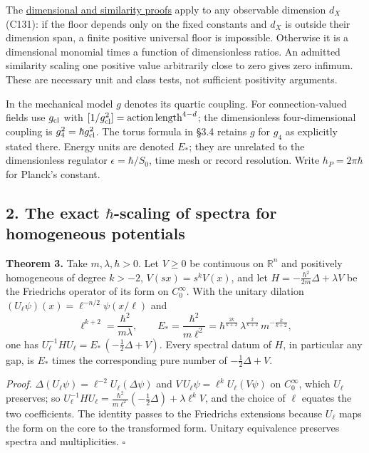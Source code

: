 \documentclass[11pt,a4paper]{article}
\begin{document}
The \href{action-unit-dimensional-selection.md}{dimensional and
similarity proofs} apply to any observable dimension \(d_X\) (C131): if
the floor depends only on the fixed constants and \(d_X\) is outside
their dimension span, a finite positive universal floor is impossible.
Otherwise it is a dimensional monomial times a function of dimensionless
ratios. An admitted similarity scaling one positive value arbitrarily
close to zero gives zero infimum. These are necessary unit and class
tests, not sufficient positivity arguments.

In the mechanical model \(g\) denotes its quartic coupling. For
connection-valued fields use \(g_{\rm cl}\) with
\([1/g_{\rm cl}^2]=\mathrm{action}\,\mathrm{length}^{4-d}\); the
dimensionless four-dimensional coupling is \(g_4^2=\hbar g_{\rm cl}^2\).
The torus formula in §3.4 retains \(g\) for \(g_4\) as explicitly stated
there. Energy units are denoted \({E_*}\); they are unrelated to the
dimensionless regulator \(\epsilon=\hbar/S_0\), time mesh or record
resolution. Write \(h_P=2\pi\hbar\) for Planck's constant.

\hypertarget{the-exact-hbar-scaling-of-spectra-for-homogeneous-potentials}{%
\subsection{\texorpdfstring{2. The exact \(\hbar\)-scaling of spectra
for homogeneous
potentials}{2. The exact \textbackslash hbar-scaling of spectra for homogeneous potentials}}\label{the-exact-hbar-scaling-of-spectra-for-homogeneous-potentials}}

\textbf{Theorem 3.} Take \(m,\lambda,\hbar>0\). Let \(V\ge0\) be
continuous on \(\mathbb R^n\) and positively homogeneous of degree
\(k>-2\), \(V(sx)=s^kV(x)\), and let
\(H=-\frac{\hbar^2}{2m}\Delta+\lambda V\) be the Friedrichs operator of
its form on \(C_0^\infty\). With the unitary dilation
\((U_\ell\psi)(x)=\ell^{-n/2}\psi(x/\ell)\) and
\[\ell^{k+2}=\frac{\hbar^2}{m\lambda},\qquad
{E_*}=\frac{\hbar^2}{m\ell^2}
=\hbar^{\frac{2k}{k+2}}\,\lambda^{\frac{2}{k+2}}\,m^{-\frac{k}{k+2}},\]
one has \(U_\ell^{-1}HU_\ell={E_*}\,(-\tfrac12\Delta+V)\). Every
spectral datum of \(H\), in particular any gap, is \({E_*}\) times the
corresponding pure number of \(-\tfrac12\Delta+V\).

\emph{Proof.} \(\Delta(U_\ell\psi)=\ell^{-2}U_\ell(\Delta\psi)\) and
\(V\,U_\ell\psi=\ell^{k}U_\ell(V\psi)\) on \(C_0^\infty\), which
\(U_\ell\) preserves; so
\(U_\ell^{-1}HU_\ell=\frac{\hbar^2}{m\ell^2}(-\tfrac12\Delta) +\lambda\ell^kV\),
and the choice of \(\ell\) equates the two coefficients. The identity
passes to the Friedrichs extensions because \(U_\ell\) maps the form on
the core to the transformed form. Unitary equivalence preserves spectra
and multiplicities. \(\square\)
\end{document}
